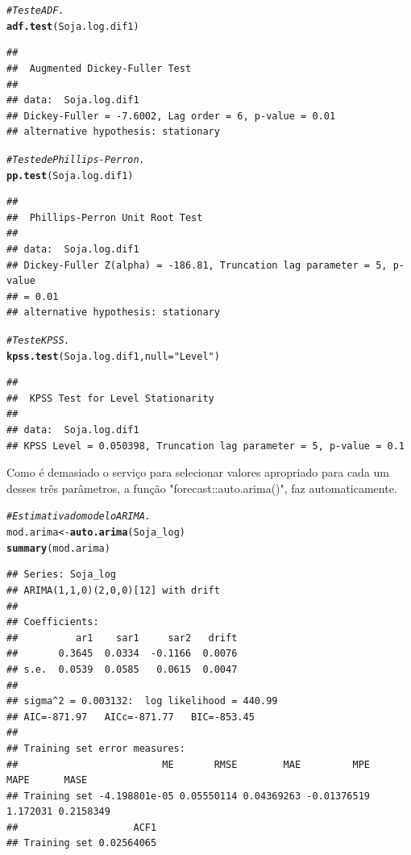 \documentclass[
	12pt,				%
	openright,			%
	oneside,      %
	a4paper,			%
	english,			%
	french,				%
	spanish,			%
	brazil,				%
	]{abntex2}\usepackage[]{graphicx}\usepackage[table]{xcolor}
\makeatletter
\newcommand{\hlstr}[1]{\textcolor[rgb]{0.192,0.494,0.8}{#1}}%
\newcommand{\hlcom}[1]{\textcolor[rgb]{0.678,0.584,0.686}{\textit{#1}}}%
\newcommand{\hlstd}[1]{\textcolor[rgb]{0.345,0.345,0.345}{#1}}%
\newcommand{\hlkwb}[1]{\textcolor[rgb]{0.69,0.353,0.396}{#1}}%
\newcommand{\hlkwc}[1]{\textcolor[rgb]{0.333,0.667,0.333}{#1}}%
\newcommand{\hlkwd}[1]{\textcolor[rgb]{0.737,0.353,0.396}{\textbf{#1}}}%
\newenvironment{kframe}{%
 \def\at@end@of@kframe{}%
 \ifinner\ifhmode%
  \def\at@end@of@kframe{\end{minipage}}%
  \begin{minipage}{\columnwidth}%
 \fi\fi%
 \def\FrameCommand##1{\hskip\@totalleftmargin \hskip-\fboxsep
 \colorbox{shadecolor}{##1}\hskip-\fboxsep
     \hskip-\linewidth \hskip-\@totalleftmargin \hskip\columnwidth}%
 \MakeFramed {\advance\hsize-\width
   \@totalleftmargin\z@ \linewidth\hsize
   \@setminipage}}%
 {\par\unskip\endMakeFramed%
 \at@end@of@kframe}
\newenvironment{knitrout}{}{} %
\theoremstyle{definition}
\theoremstyle{remark}
\makeatother
\begin{document}
\begin{knitrout}
\color{fgcolor}\begin{kframe}
\begin{alltt}
\hlcom{# Teste ADF.}
\hlkwd{adf.test}\hlstd{(Soja.log.dif1)}
\end{alltt}
\begin{verbatim}
## 
## 	Augmented Dickey-Fuller Test
## 
## data:  Soja.log.dif1
## Dickey-Fuller = -7.6002, Lag order = 6, p-value = 0.01
## alternative hypothesis: stationary
\end{verbatim}
\begin{alltt}
\hlcom{# Teste de Phillips-Perron.}
\hlkwd{pp.test}\hlstd{(Soja.log.dif1)}
\end{alltt}
\begin{verbatim}
## 
## 	Phillips-Perron Unit Root Test
## 
## data:  Soja.log.dif1
## Dickey-Fuller Z(alpha) = -186.81, Truncation lag parameter = 5, p-value
## = 0.01
## alternative hypothesis: stationary
\end{verbatim}
\begin{alltt}
\hlcom{# Teste KPSS.}
\hlkwd{kpss.test}\hlstd{(Soja.log.dif1,} \hlkwc{null} \hlstd{=} \hlstr{"Level"}\hlstd{)}
\end{alltt}
\begin{verbatim}
## 
## 	KPSS Test for Level Stationarity
## 
## data:  Soja.log.dif1
## KPSS Level = 0.050398, Truncation lag parameter = 5, p-value = 0.1
\end{verbatim}
\end{kframe}
\end{knitrout}


Como é demasiado o serviço para selecionar valores apropriado para cada um desses três parâmetros, a função "forecast::auto.arima()", faz automaticamente.

\begin{knitrout}
\color{fgcolor}\begin{kframe}
\begin{alltt}
\hlcom{# Estimativa do modelo ARIMA.}
\hlstd{mod.arima} \hlkwb{<-} \hlkwd{auto.arima}\hlstd{(Soja_log)}
\hlkwd{summary}\hlstd{(mod.arima)}
\end{alltt}
\begin{verbatim}
## Series: Soja_log 
## ARIMA(1,1,0)(2,0,0)[12] with drift 
## 
## Coefficients:
##          ar1    sar1     sar2   drift
##       0.3645  0.0334  -0.1166  0.0076
## s.e.  0.0539  0.0585   0.0615  0.0047
## 
## sigma^2 = 0.003132:  log likelihood = 440.99
## AIC=-871.97   AICc=-871.77   BIC=-853.45
## 
## Training set error measures:
##                         ME       RMSE        MAE         MPE     MAPE      MASE
## Training set -4.198801e-05 0.05550114 0.04369263 -0.01376519 1.172031 0.2158349
##                    ACF1
## Training set 0.02564065
\end{verbatim}
\end{kframe}
\end{knitrout}
\end{document}
